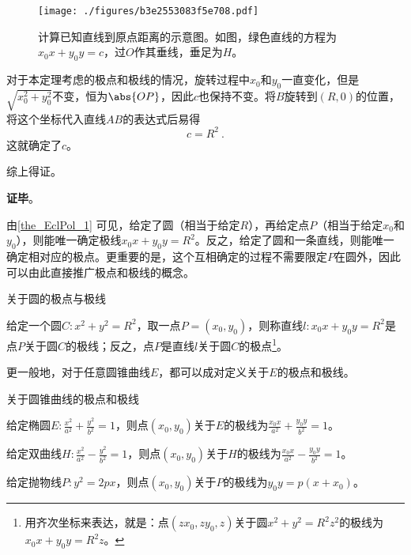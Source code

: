 \begin{figure}[ht]
\centering
\texttt{[image: ./figures/b3e2553083f5e708.pdf]}
\caption{计算已知直线到原点距离的示意图。如图，绿色直线的方程为$x_0x+y_0y=c$，过$O$作其垂线，垂足为$H$。} \label{fig_EclPol_2}
\end{figure}


对于本定理考虑的极点和极线的情况，旋转过程中$x_0$和$y_0$一直变化，但是$\sqrt{x_0^2+y_0^2}$不变，恒为$\abs{OP}$，因此$c$也保持不变。将$B$旋转到$(R, 0)$的位置，将这个坐标代入直线$AB$的表达式后易得
\begin{equation}
c=R^2~. 
\end{equation}
这就确定了$c$。

综上得证。

\textbf{证毕}。



由\autoref{the_EclPol_1} 可见，给定了圆（相当于给定$R$），再给定点$P$（相当于给定$x_0$和$y_0$），则能唯一确定极线$x_0x+y_0y=R^2$。反之，给定了圆和一条直线，则能唯一确定相对应的极点。更重要的是，这个互相确定的过程不需要限定$P$在圆外，因此可以由此直接推广极点和极线的概念。




\begin{definition}{关于圆的极点与极线}\label{def_EclPol_2}

给定一个圆$C: x^2+y^2=R^2$，取一点$P=(x_0, y_0)$，则称直线$l:x_0x+y_0y=R^2$是点$P$关于圆$C$的极线；反之，点$P$是直线$l$关于圆$C$的极点\footnote{用齐次坐标来表达，就是：点$(zx_0, zy_0, z)$关于圆$x^2+y^2=R^2z^2$的极线为$x_0x+y_0y=R^2z$。}。

\end{definition}





更一般地，对于任意圆锥曲线$E$，都可以成对定义关于$E$的极点和极线。



\begin{definition}{关于圆锥曲线的极点和极线}

给定椭圆$E:\frac{x^2}{a^2}+\frac{y^2}{b^2}=1$，则点$(x_0, y_0)$关于$E$的极线为$\frac{x_0x}{a^2}+\frac{y_0y}{b^2}=1$。

给定双曲线$H:\frac{x^2}{a^2}-\frac{y^2}{b^2}=1$，则点$(x_0, y_0)$关于$H$的极线为$\frac{x_0x}{a^2}-\frac{y_0y}{b^2}=1$。

给定抛物线$P:y^2=2px$，则点$(x_0, y_0)$关于$P$的极线为$y_0y=p(x+x_0)$。

\end{definition}

